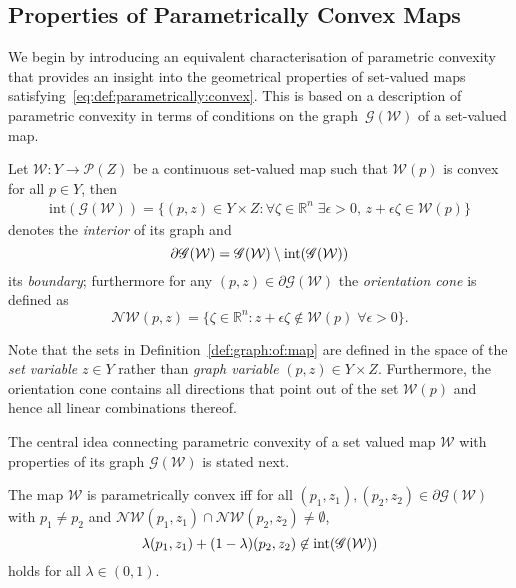 \documentclass[smallextended]{svjour3}       %
\numberwithin{equation}{section}
\begin{document}
\subsection{Properties of Parametrically Convex Maps}\label{ssec:properties:of:p:convex:maps}
%
We begin by introducing an equivalent characterisation of parametric convexity that provides an insight into the geometrical properties of 
set-valued maps satisfying~\eqref{eq:def:parametrically:convex}.
%
This is based on a description of parametric convexity in terms of conditions on the graph~$\mathscr G(\mathcal W)$ of a set-valued map.
%
\begin{definition}\label{def:graph:of:map}
Let $\mathcal W:Y\rightarrow \mathscr P(Z)$ be a continuous set-valued map
such that $\mathcal W(p)$ is convex for all $p\in Y$, then 
%
\begin{equation*}\begin{aligned}
\text{int}(\mathscr G(\mathcal W)) = \{(p,z) \in Y\times Z : \forall \zeta\in\mathbb R^n\;\exists \epsilon>0, \, z+\epsilon \zeta\in \mathcal W(p) \}
\end{aligned}\end{equation*}
%
denotes the \emph{interior} of its graph and
%
\[
  \partial \mathscr G(\mathcal W) = \mathscr G(\mathcal W)\setminus \textup{int}(\mathscr G(\mathcal W))
\]
%
its \emph{boundary};
%
furthermore for any $(p,z)\in\partial\mathscr G(\mathcal W)$ the \emph{orientation cone} is defined as 
%
\[
  \mathcal N\mathcal W(p,z) = \{\zeta \in\mathbb R^n: z+\epsilon \zeta \not\in \mathcal W(p)\; \forall \epsilon>0\} .
\]
%
\end{definition}
%
\begin{remark}
%
Note that the sets in Definition~\ref{def:graph:of:map} are defined in the space of the \emph{set variable} $z\in Y$ rather than \emph{graph variable} $(p,z)\in Y\times Z$.
%
Furthermore, the orientation cone contains all directions that point out of the set $\mathcal W(p)$ and hence all linear combinations thereof.
%
\end{remark}
%
The central idea connecting parametric convexity of a set valued map $\mathcal W$ with properties of its graph $\mathscr G(\mathcal W)$ is stated next.
%
\begin{theorem}\label{thm:p:convexity:graph}
The map $\mathcal W$ is parametrically convex iff for all $(p_1,z_1), (p_2,z_2)\in\partial\mathscr G(\mathcal W)$
with $p_1\neq p_2$ and $\mathcal N\mathcal W(p_1,z_1)\cap\mathcal N\mathcal W(p_2,z_2)\neq\emptyset$,
%
\begin{equation}\label{eq:graph:def:p:convexity}
\lambda (p_1,z_1) + (1-\lambda) (p_2,z_2) \not\in\textup{int} (\mathscr G(\mathcal W))
\end{equation}
%
holds for all $\lambda\in(0,1)$.
%
\end{theorem}
\end{document}
